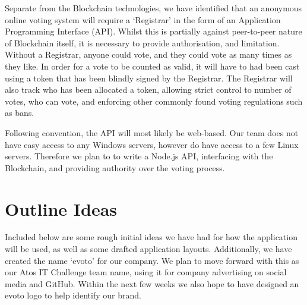 \documentclass{article}
\begin{document}
Separate from the Blockchain technologies, we have identified that an anonymous online voting system will require a `Registrar' in the form of an Application Programming Interface (API). Whilst this is partially against peer-to-peer nature of Blockchain itself, it is necessary to provide authorisation, and limitation. Without a Registrar, anyone could vote, and they could vote as many times as they like. In order for a vote to be counted as valid, it will have to had been cast using a token that has been blindly signed by the Registrar. The Registrar will also track who has been allocated a token, allowing strict control to number of votes, who can vote, and enforcing other commonly found voting regulations such as bans.

\par

Following convention, the API will most likely be web-based. Our team does not have easy access to any Windows servers, however do have access to a few Linux servers. Therefore we plan to to write a Node.js API, interfacing with the Blockchain, and providing authority over the voting process.

\section{Outline Ideas}

Included below are some rough initial ideas we have had for how the application will be used, as well as some drafted application layouts. Additionally, we have created the name `evoto' for our company. We plan to move forward with this as our Atos IT Challenge team name, using it for company advertising on social media and GitHub. Within the next few weeks we also hope to have designed an evoto logo to help identify our brand.
\end{document}
